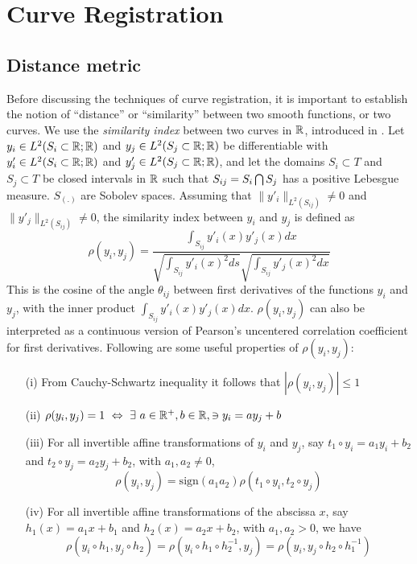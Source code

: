 \section{Curve Registration} \label{Ch3_Regist}
\subsection{Distance metric}
Before discussing the techniques of curve registration, it is important to establish the notion of ``distance'' or ``similarity'' between two smooth functions, or two curves. We use the {\emph{similarity index}} between two curves in $\mathbb{R}$, introduced in \cite{Sangalli_etal_2009_JASA}. Let $y_i \in L^2(S_i \subset \mathbb{R}; \mathbb{R})$ and $y_j \in L^2(S_j \subset \mathbb{R}; \mathbb{R})$ be differentiable with $y'_i \in L^2(S_i \subset \mathbb{R}; \mathbb{R})$ and $y'_j \in L^2(S_j \subset \mathbb{R}; \mathbb{R})$, and let the domains $S_i \subset T$ and $S_j  \subset T$ be closed intervals in $\mathbb{R}$ such that $S_{ij} = S_i \bigcap S_j$ has a positive Lebesgue measure. $S_{(.)}$ are Sobolev spaces. Assuming that $\|y'_i\|_{L^2(S_{ij})} \ne 0$ and $\|y'_j\|_{L^2(S_{ij})} \ne 0$, the similarity index between $y_i$ and $y_j$ is defined as
\begin{equation}
\rho(y_i, y_j) = \frac{\int _{S_{ij}}y'_i(x)y'_j(x) dx}{\sqrt{\int _{S_{ij}}y'_i(x)^2 ds}\sqrt{ \int _{S_{ij}} y'_j(x)^2 dx}}
\label{eq:3_similarity}
\end{equation}
This is the cosine of the angle $\theta_{ij}$ between first derivatives of the functions $y_i$ and $y_j$, with the inner product $\int _{S_{ij}}y'_i(x)y'_j(x) dx$.  $\rho(y_i, y_j)$ can also be interpreted as a continuous version of Pearson’s uncentered correlation coefficient for first derivatives. Following are some useful properties of $\rho(y_i, y_j)$:
\begin{enumerate}
\item[(i)] From Cauchy-Schwartz inequality it follows that $|\rho(y_i, y_j)| \leq 1$
\item[(ii)] $\rho(y_i, y_j) = 1 \ \Leftrightarrow \ \exists \ a \in \mathbb{R}^{+}, b \in \mathbb{R}, \ni y_i = ay_j + b $
\item[(iii)] For all invertible affine transformations of $y_i$ and $y_j$, say $t_1 \circ y_i = a_1y_i + b_2$ and $t_2 \circ y_j = a_2y_j + b_2$, with $a_1, a_2 \ne 0$, 
\[ \rho(y_i, y_j) = \text{sign}(a_1 a_2)\rho(t_1 \circ y_i, t_2 \circ y_j)\]
\item[(iv)] For all invertible affine transformations of the abscissa $x$, say $h_1(x) = a_1 x + b_1$ and $h_2(x) = a_2 x + b_2$, with $a_1, a_2 > 0$, we have
\[ \rho(y_i \circ h_1, y_j \circ h_2) = \rho(y_i \circ h_1 \circ h_2^{-1}, y_j) = \rho(y_i , y_j \circ h_2 \circ h_1^{-1}) \]
\end{enumerate}

